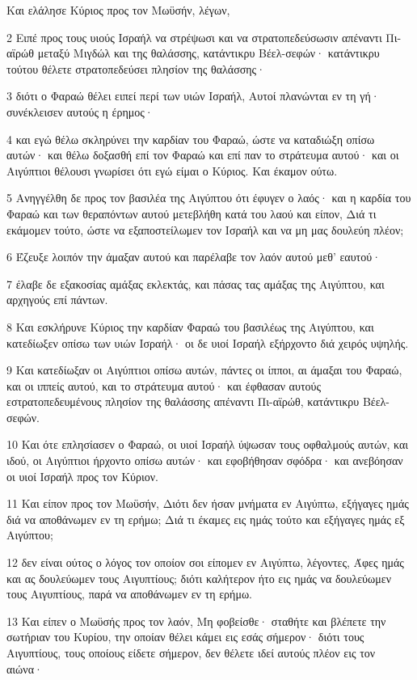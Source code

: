 \par Και ελάλησε Κύριος προς τον Μωϋσήν, λέγων,
\par 2 Ειπέ προς τους υιούς Ισραήλ να στρέψωσι και να στρατοπεδεύσωσιν απέναντι Πι-αϊρώθ μεταξύ Μιγδώλ και της θαλάσσης, κατάντικρυ Βέελ-σεφών· κατάντικρυ τούτου θέλετε στρατοπεδεύσει πλησίον της θαλάσσης·
\par 3 διότι ο Φαραώ θέλει ειπεί περί των υιών Ισραήλ, Αυτοί πλανώνται εν τη γή· συνέκλεισεν αυτούς η έρημος·
\par 4 και εγώ θέλω σκληρύνει την καρδίαν του Φαραώ, ώστε να καταδιώξη οπίσω αυτών· και θέλω δοξασθή επί τον Φαραώ και επί παν το στράτευμα αυτού· και οι Αιγύπτιοι θέλουσι γνωρίσει ότι εγώ είμαι ο Κύριος. Και έκαμον ούτω.
\par 5 Ανηγγέλθη δε προς τον βασιλέα της Αιγύπτου ότι έφυγεν ο λαός· και η καρδία του Φαραώ και των θεραπόντων αυτού μετεβλήθη κατά του λαού και είπον, Διά τι εκάμομεν τούτο, ώστε να εξαποστείλωμεν τον Ισραήλ και να μη μας δουλεύη πλέον;
\par 6 Έζευξε λοιπόν την άμαξαν αυτού και παρέλαβε τον λαόν αυτού μεθ' εαυτού·
\par 7 έλαβε δε εξακοσίας αμάξας εκλεκτάς, και πάσας τας αμάξας της Αιγύπτου, και αρχηγούς επί πάντων.
\par 8 Και εσκλήρυνε Κύριος την καρδίαν Φαραώ του βασιλέως της Αιγύπτου, και κατεδίωξεν οπίσω των υιών Ισραήλ· οι δε υιοί Ισραήλ εξήρχοντο διά χειρός υψηλής.
\par 9 Και κατεδίωξαν οι Αιγύπτιοι οπίσω αυτών, πάντες οι ίπποι, αι άμαξαι του Φαραώ, και οι ιππείς αυτού, και το στράτευμα αυτού· και έφθασαν αυτούς εστρατοπεδευμένους πλησίον της θαλάσσης απέναντι Πι-αϊρώθ, κατάντικρυ Βέελ-σεφών.
\par 10 Και ότε επλησίασεν ο Φαραώ, οι υιοί Ισραήλ ύψωσαν τους οφθαλμούς αυτών, και ιδού, οι Αιγύπτιοι ήρχοντο οπίσω αυτών· και εφοβήθησαν σφόδρα· και ανεβόησαν οι υιοί Ισραήλ προς τον Κύριον.
\par 11 Και είπον προς τον Μωϋσήν, Διότι δεν ήσαν μνήματα εν Αιγύπτω, εξήγαγες ημάς διά να αποθάνωμεν εν τη ερήμω; Διά τι έκαμες εις ημάς τούτο και εξήγαγες ημάς εξ Αιγύπτου;
\par 12 δεν είναι ούτος ο λόγος τον οποίον σοι είπομεν εν Αιγύπτω, λέγοντες, Άφες ημάς και ας δουλεύωμεν τους Αιγυπτίους; διότι καλήτερον ήτο εις ημάς να δουλεύωμεν τους Αιγυπτίους, παρά να αποθάνωμεν εν τη ερήμω.
\par 13 Και είπεν ο Μωϋσής προς τον λαόν, Μη φοβείσθε· σταθήτε και βλέπετε την σωτήριαν του Κυρίου, την οποίαν θέλει κάμει εις εσάς σήμερον· διότι τους Αιγυπτίους, τους οποίους είδετε σήμερον, δεν θέλετε ιδεί αυτούς πλέον εις τον αιώνα·
